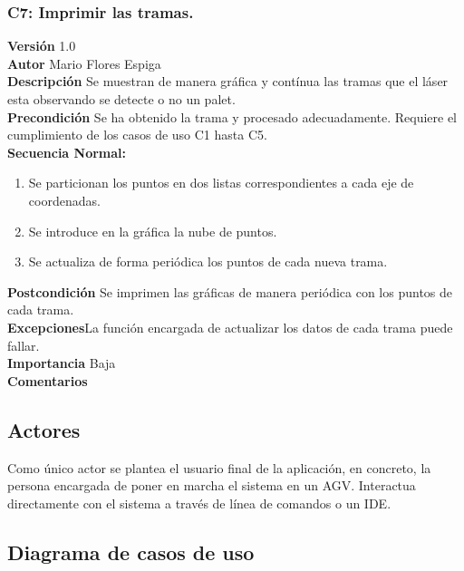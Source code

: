 \subsubsection{ C7: Imprimir las tramas.}
\textbf{Versión} 1.0\\
\textbf{Autor} Mario Flores Espiga\\
\textbf{Descripción} Se muestran de manera gráfica y contínua las tramas que el láser esta observando se detecte o no un palet.\\
\textbf{Precondición} Se ha obtenido la trama y procesado adecuadamente. Requiere el cumplimiento de los casos de uso C1 hasta C5.\\
\textbf{Secuencia Normal:} 
\begin{enumerate}
	\item Se particionan los puntos en dos listas correspondientes a cada eje de coordenadas.
	\item Se introduce en la gráfica la nube de puntos.
	\item Se actualiza de forma periódica los puntos de cada nueva trama.

	

\end{enumerate}
\textbf{Postcondición} Se imprimen las gráficas de manera periódica con los puntos de cada trama.\\
\textbf{Excepciones}La función encargada de actualizar los datos de cada trama puede fallar.\\
\textbf{Importancia} Baja\\
\textbf{Comentarios} 


\subsection{Actores}

Como único actor se plantea el usuario final de la aplicación, en concreto, la persona encargada de poner en marcha el sistema en un AGV. Interactua directamente con el sistema a través de línea de comandos o un IDE.


\subsection{Diagrama de casos de uso}
